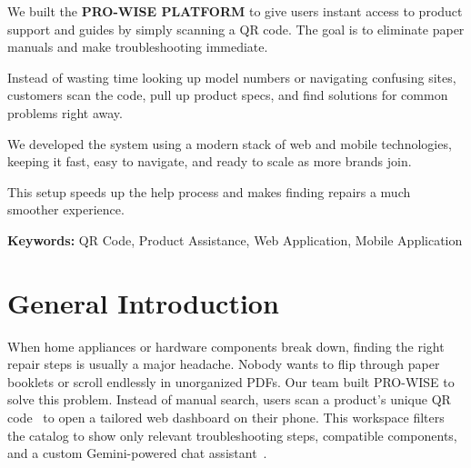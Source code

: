 \documentclass[12pt,a4paper]{report}
\begin{document}
We built the \textbf{PRO-WISE PLATFORM} to give users instant access to product support and guides by simply scanning a QR code. The goal is to eliminate paper manuals and make troubleshooting immediate.

\vspace{0.8cm}

Instead of wasting time looking up model numbers or navigating confusing sites, customers scan the code, pull up product specs, and find solutions for common problems right away.

\vspace{0.8cm}

We developed the system using a modern stack of web and mobile technologies, keeping it fast, easy to navigate, and ready to scale as more brands join.

\vspace{0.8cm}

This setup speeds up the help process and makes finding repairs a much smoother experience.

\vspace{0.8cm}

\textbf{Keywords:} QR Code, Product Assistance, Web Application, Mobile Application

\vfill


\cleardoublepage
{}

\tableofcontents
\thispagestyle{plain}


\cleardoublepage
\listoffigures
\thispagestyle{plain}


\cleardoublepage
\listoftables
\thispagestyle{plain}


\chapter*{General Introduction}

When home appliances or hardware components break down, finding the right repair steps is usually a major headache. Nobody wants to flip through paper booklets or scroll endlessly in unorganized PDFs. Our team built PRO-WISE to solve this problem. Instead of manual search, users scan a product's unique QR code~\cite{qrcode} to open a tailored web dashboard on their phone. This workspace filters the catalog to show only relevant troubleshooting steps, compatible components, and a custom Gemini-powered chat assistant~\cite{gemini}.
\end{document}
